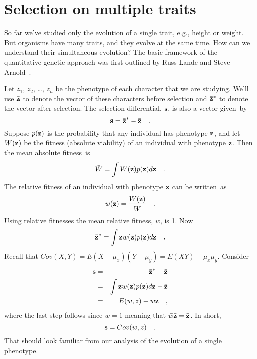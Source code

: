 \documentclass[12pt]{article}
\begin{document}
\section*{Selection on multiple traits}

So far we've studied only the evolution of a single trait, e.g.,
height or weight. But organisms have many traits, and they evolve at
the same time. How can we understand their simultaneous evolution? The
basic framework of the quantitative genetic approach was first
outlined by Russ Lande and Steve
Arnold~\cite{Lande-Arnold-1983}.

Let $z_1$, $z_2$, \dots, $z_n$ be the phenotype of each character that
we are studying. We'll use $\bar{\bf z}$ to denote the vector of these
characters before selection and $\bar{\bf z}^*$ to denote the vector after
selection. The selection differential, $\bf s$, is also a vector
given~by
\[
{\bf s} = \bar{\bf z}^* - \bar{\bf z} \quad .
\]
Suppose $p({\bf z})$ is the probability that any individual has
phenotype $\bf z$, and let $W({\bf z})$ be the fitness (absolute
viability) of an individual with phenotype $\bf z$. Then the mean
absolute fitness~is
\[
\bar W = \int W({\bf z})p({\bf z})d{\bf z} \quad .
\]
The relative fitness of an individual with phenotype $\bf z$ can be
written~as
\[
w({\bf z}) = {W({\bf z}) \over \bar W} \quad .
\]
Using relative fitnesses the mean relative fitness, $\bar w$, is
1. Now
\[
\bar{\bf z}^* = \int {\bf z}w({\bf z})p({\bf z})d{\bf z} \quad .
\]
Recall that $Cov(X,Y) = E(X - \mu_x)(Y - \mu_y) = E(XY) -
\mu_x\mu_y$. Consider 
\begin{eqnarray*}
{\bf s} &=& \bar{\bf z}^* - \bar{\bf z} \\
        &=& \int {\bf z}w({\bf z})p({\bf z})d{\bf z} - \bar {\bf z} \\
        &=& E(w,z) - \bar w\bar {\bf z} \quad ,
\end{eqnarray*}
where the last step follows since $\bar w = 1$ meaning that $\bar
w\bar{\bf z} = \bar{\bf z}$. In short, 
\[
{\bf s} = Cov(w,z) \quad .
\]
That should look familiar from our analysis of the evolution of a
single phenotype.
\end{document}
